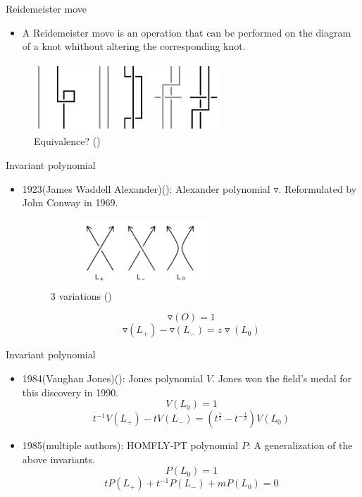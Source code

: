 \documentclass[]{beamer}
\begin{document}
\begin{frame}{Reidemeister move}
\begin{itemize}
    \item A Reidemeister move is an operation that can be performed on the diagram
of a knot whithout altering the corresponding knot.
\end{itemize}
\begin{figure}
    \centering
\includegraphics[width=7cm]{Pictures/r.png}
    \caption{Equivalence? (\cite{reidemeister})}
    \label{fig:enter-label}
\end{figure}

\end{frame}

\begin{frame}{Invariant polynomial}
    \begin{itemize}
        \item 1923(James Waddell Alexander)(\cite{Alexander}): Alexander polynomial $\triangledown$. Reformulated by John Conway in 1969.
\begin{figure}
   \centering
\includegraphics[width =7cm, height = 2.5cm]{Pictures/L.png}
    \caption{3 variations (\cite{L+})}
    \label{fig:enter-label}
\end{figure}
        $$\triangledown(O) = 1$$
        $$\triangledown(L_+) - \triangledown(L_-) = z\triangledown(L_0)$$
    \end{itemize}
\end{frame}

\begin{frame}{Invariant polynomial}
\begin{itemize}
    \item 1984(Vaughan Jones)(\cite{Jones}): Jones polynomial $V$. Jones won the field's medal for this discovery in 1990.
    $$V(L_0) = 1$$
    $$t^{-1}V(L_+) - tV(L_-) = (t^{\frac{1}{2}} - t^{-\frac{1}{2}})V(L_0)$$
    \item 1985(multiple authors): HOMFLY-PT polynomial $P$: A generalization of the above invariants.
    $$P(L_0) = 1$$
    $$tP(L_+) + t^{-1}P(L_-) + mP(L_0) = 0$$
\end{itemize}
\end{frame}
\end{document}
